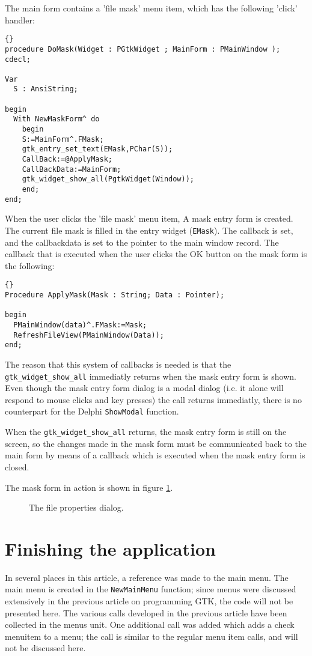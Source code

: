 \documentclass[10pt]{article}
\newcommand{\file}[1]{\textsf{#1}}
\begin{document}
The main form contains a 'file mask' menu item, which has the following
'click' handler:
\begin{lstlisting}{}
procedure DoMask(Widget : PGtkWidget ; MainForm : PMainWindow ); cdecl;
 
Var
  S : AnsiString;
 
begin
  With NewMaskForm^ do
    begin
    S:=MainForm^.FMask;
    gtk_entry_set_text(EMask,PChar(S));
    CallBack:=@ApplyMask;
    CallBackData:=MainForm;
    gtk_widget_show_all(PgtkWidget(Window));
    end;
end;   
\end{lstlisting}
When the user clicks the 'file mask' menu item, A mask entry form is created.
The current file mask is filled in the entry widget (\lstinline|EMask|).
The callback is set, and the callbackdata is set to the pointer to the main
window record. The callback that is executed when the user clicks the OK
button on the mask form is the following:
\begin{lstlisting}{}
Procedure ApplyMask(Mask : String; Data : Pointer);
 
begin
  PMainWindow(data)^.FMask:=Mask;
  RefreshFileView(PMainWindow(Data));
end;
\end{lstlisting} 

The reason that this system of callbacks is needed is that the
\lstinline|gtk_widget_show_all| immediatly returns when the mask entry form is 
shown. Even though the mask entry form dialog is a modal dialog (i.e. it alone will
respond to mouse clicks and key presses) the call returns immediatly,
there is no counterpart for the Delphi \lstinline|ShowModal| function.

When the \lstinline|gtk_widget_show_all| returns, the mask entry form is still on
the screen, so the changes made in the mask form must be communicated 
back to the main form by means of a callback which is executed when 
the mask entry form is closed.

The mask form in action is shown in figure \ref{fig:filemask}.
\begin{figure}[ht]
\begin{center}
\caption{The file properties dialog.}\label{fig:filemask}
\end{center}
\end{figure}

\section{Finishing the application}
In several places in this article, a reference was made to the main menu. 
The main menu is created in the \lstinline|NewMainMenu| function; since
menus were discussed extensively in the previous article on programming GTK,
the code will not be presented here. The various calls developed in the
previous article have been collected in the \file{menus} unit. One
additional call was added which adds a check menuitem to a menu; the call is
similar to the regular menu item calls, and will not be discussed here.
\end{document}
